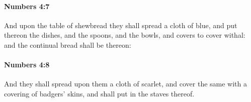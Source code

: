 		\paragraph{Numbers 4:7} %
			\label{NUMBERS-4-7}

			And upon the table of shewbread they shall spread a cloth of blue, and put thereon the dishes, and the spoons, and the bowls, and covers to cover withal: and the continual bread shall be thereon:


		\paragraph{Numbers 4:8} %
			\label{NUMBERS-4-8}

			And they shall spread upon them a cloth of scarlet, and cover the same with a covering of badgers’ skins, and shall put in the staves thereof.


